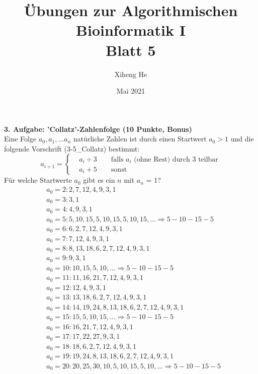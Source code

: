 \documentclass{article}
\title{Übungen zur Algorithmischen Bioinformatik I\\
Blatt 5}
\author{Xiheng He }
\date{Mai 2021}
\begin{document}
\maketitle
\begin{flushleft}
\textbf{3. Aufgabe: ’Collatz’-Zahlenfolge (10 Punkte, Bonus)}\\
Eine Folge $a_0,a_1,\dots a_n$ natürliche Zahlen ist durch einen Startwert $a_0 > 1$ und die 
folgende Vorschrift (3-5\_Collatz) bestimmt:
\begin{equation}
a_{i+1} = \left\{
\begin{aligned}
    &a_i \div 3 \qquad\text{falls $a_i$ (ohne Rest) durch 3 teilbar} \\
    &a_i + 5 \qquad\text{sonst}
\end{aligned}
\right.
\end{equation}
Für welche Startwerte $a_0$ gibt es ein $n$ mit $a_n$ = 1?
$$
\begin{aligned}
    &a_0 = 2: 2, 7, 12, 4, 9, 3, 1 \\
    &a_0 = 3: 3, 1 \\
    &a_0 = 4: 4, 9, 3, 1 \\
    &a_0 = 5: 5, 10, 15, 5, 10, 15, 5, 10, 15,\dots \Longrightarrow 5-10-15-5 \\
    &a_0 = 6: 6, 2, 7 ,12, 4, 9, 3, 1 \\
    &a_0 = 7: 7, 12, 4, 9 , 3, 1 \\
    &a_0 = 8: 8, 13, 18, 6, 2, 7, 12, 4, 9, 3, 1 \\
    &a_0 = 9: 9, 3, 1 \\
    &a_0 = 10: 10, 15, 5, 10,\dots \Longrightarrow 5-10-15-5 \\
    &a_0 = 11: 11, 16, 21, 7, 12, 4, 9, 3, 1 \\
    &a_0 = 12: 12, 4, 9, 3, 1 \\
    &a_0 = 13: 13, 18, 6, 2, 7, 12, 4, 9, 3, 1 \\
    &a_0 = 14: 14, 19, 24, 8, 13, 18, 6, 2, 7, 12, 4, 9, 3, 1 \\
    &a_0 = 15: 15, 5, 10, 15,\dots \Longrightarrow 5-10-15-5 \\
    &a_0 = 16: 16, 21, 7, 12, 4, 9, 3, 1 \\
    &a_0 = 17: 17, 22, 27, 9, 3, 1 \\
    &a_0 = 18: 18, 6, 2, 7, 12, 4, 9, 3, 1 \\
    &a_0 = 19: 19, 24, 8, 13, 18, 6, 2, 7, 12, 4, 9, 3, 1 \\
    &a_0 = 20: 20, 25, 30, 10, 5, 10, 15, 5, 10,\dots \Longrightarrow 5-10-15-5

\end{aligned}$$
\end{flushleft}
\end{document}
